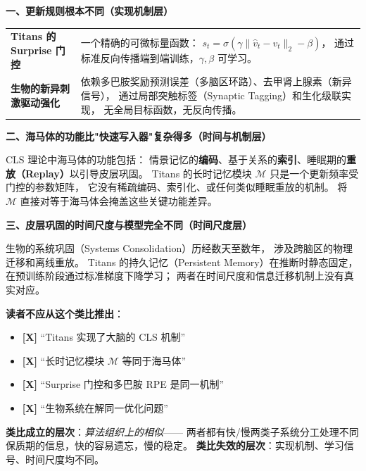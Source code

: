 \begin{analogyboundarybox}[title=这个类比在哪里失效]

\textbf{一、更新规则根本不同（实现机制层）}

\begin{tabular}{p{5cm} p{8cm}}
\textbf{Titans 的 Surprise 门控}
& 一个精确的可微标量函数：
  $s_t = \sigma(\gamma \|\hat{v}_t - v_t\|_2 - \beta)$，
  通过标准反向传播端到端训练，$\gamma, \beta$ 可学习。 \\
\textbf{生物的新异刺激驱动强化}
& 依赖多巴胺奖励预测误差（多脑区环路）、去甲肾上腺素（新异信号），
  通过局部突触标签（Synaptic Tagging）和生化级联实现，
  无全局目标函数，无反向传播。 \\
\end{tabular}

\medskip\textbf{二、海马体的功能比"快速写入器"复杂得多（时间与机制层）}

CLS 理论中海马体的功能包括：
情景记忆的\textbf{编码}、基于关系的\textbf{索引}、睡眠期的\textbf{重放（Replay）}以引导皮层巩固。
Titans 的长时记忆模块 $\mathcal{M}$ 只是一个更新频率受门控的参数矩阵，
它没有稀疏编码、索引化、或任何类似睡眠重放的机制。
将 $\mathcal{M}$ 直接对等于海马体会掩盖这些关键功能差异。

\medskip\textbf{三、皮层巩固的时间尺度与模型完全不同（时间尺度层）}

生物的系统巩固（Systems Consolidation）历经数天至数年，
涉及跨脑区的物理迁移和离线重放。
Titans 的持久记忆（Persistent Memory）在推断时静态固定，
在预训练阶段通过标准梯度下降学习；
两者在时间尺度和信息迁移机制上没有真实对应。

\medskip\textbf{读者不应从这个类比推出}：
\begin{itemize}
  \item \textbf{[X]} ``Titans 实现了大脑的 CLS 机制''
  \item \textbf{[X]} ``长时记忆模块 $\mathcal{M}$ 等同于海马体''
  \item \textbf{[X]} ``Surprise 门控和多巴胺 RPE 是同一机制''
  \item \textbf{[X]} ``生物系统在解同一优化问题''
\end{itemize}

\medskip
\textbf{类比成立的层次}：\textit{算法组织上的相似}——
两者都有快/慢两类子系统分工处理不同保质期的信息，快的容易遗忘，慢的稳定。
\textbf{类比失效的层次}：实现机制、学习信号、时间尺度均不同。

\end{analogyboundarybox}

